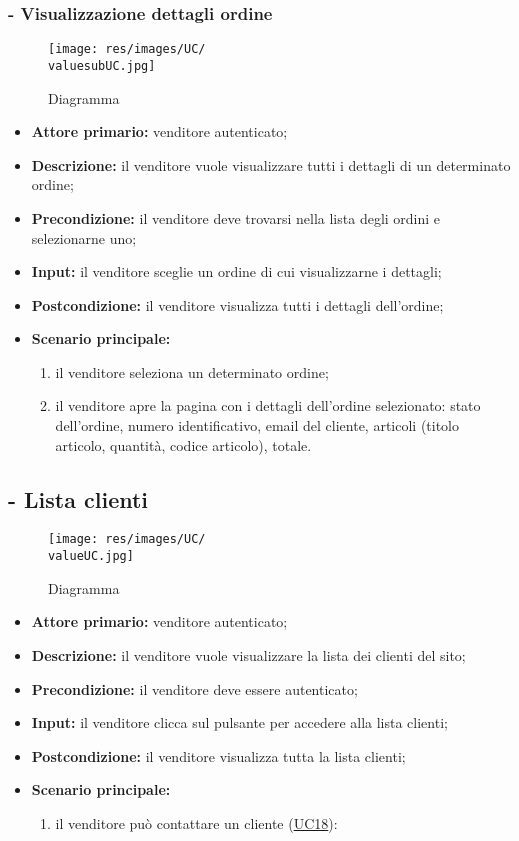 \subsubsection{- Visualizzazione dettagli ordine}
\begin{figure}[H]
    \centering
    \texttt{[image: res/images/UC/\\valuesubUC.jpg]}
    \caption{Diagramma }
\end{figure}
\begin{itemize}
    \item \textbf{Attore primario:} venditore autenticato;
    \item \textbf{Descrizione:} il venditore vuole visualizzare tutti i dettagli di un determinato ordine;
    \item \textbf{Precondizione:} il venditore deve trovarsi nella lista degli ordini e selezionarne uno;
    \item \textbf{Input:} il venditore sceglie un ordine di cui visualizzarne i dettagli;
    \item \textbf{Postcondizione:} il venditore visualizza tutti i dettagli dell'ordine;
    \item \textbf{Scenario principale:}
          \begin{enumerate}
              \item il venditore seleziona un determinato ordine;
              \item il venditore apre la pagina con i dettagli dell'ordine selezionato: stato dell'ordine, numero identificativo, email del cliente, articoli (titolo articolo, quantità, codice articolo), totale.
          \end{enumerate}
\end{itemize}


\stepUserCase
\subsection{ - Lista clienti}
\begin{figure}[H]
    \centering
    \texttt{[image: res/images/UC/\\valueUC.jpg]}
    \caption{Diagramma }
\end{figure}
\begin{itemize}
    \item \textbf{Attore primario:} venditore autenticato;
    \item \textbf{Descrizione:} il venditore vuole visualizzare la lista dei clienti del sito;
    \item \textbf{Precondizione:} il venditore deve essere autenticato;
    \item \textbf{Input:} il venditore clicca sul pulsante per accedere alla lista clienti;
    \item \textbf{Postcondizione:} il venditore visualizza tutta la lista clienti;
    \item \textbf{Scenario principale:}
          \begin{enumerate}
              \item il venditore può contattare un cliente (\hyperref[UC18]{UC18}):
          \end{enumerate}
\end{itemize}


